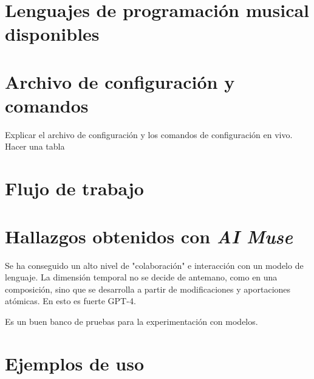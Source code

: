 \section{Lenguajes de programación musical disponibles}

\section{Archivo de configuración y comandos}

Explicar el archivo de configuración y los comandos de configuración en vivo. Hacer una tabla

\section{Flujo de trabajo}

\section{Hallazgos obtenidos con \textit{AI Muse}}

Se ha conseguido un alto nivel de "colaboración" e interacción con un modelo de lenguaje. La dimensión temporal no se decide de antemano, como en una composición, sino que se desarrolla a partir de modificaciones y aportaciones atómicas. En esto es fuerte GPT-4.

Es un buen banco de pruebas para la experimentación con modelos. 



\section{Ejemplos de uso}